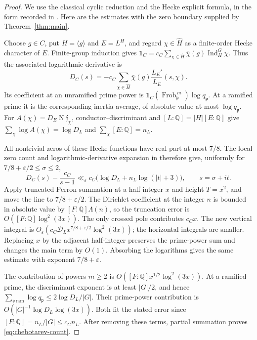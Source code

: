 \documentclass[11pt,a4paper]{article}
\numberwithin{equation}{section}
\theoremstyle{definition}
\theoremstyle{remark}
\newcommand{\eps}{\varepsilon}
\newcommand{\QQ}{\mathbb Q}
\newcommand{\Norm}{\operatorname{N}}
\newcommand{\ind}{\mathbf 1}
\begin{document}
\begin{proof}
We use the classical cyclic reduction and the Hecke explicit formula,
in the form recorded in \cite[Section~3, Lemmas~4--5 and Proposition~6]{DKN}.
Here are the estimates with the zero boundary supplied by
Theorem~\ref{thm:main}.

Choose $g\in C$, put $H=\langle g\rangle$ and $E=L^H$, and regard
$\chi\in\widehat H$ as a finite-order Hecke character of $E$.
Finite-group induction gives
$\ind_C=c_C\sum_{\chi\in\widehat H}\bar\chi(g)
\operatorname{Ind}_H^G\chi$. Thus the associated logarithmic derivative is
\begin{equation}\label{eq:chebotarev-logder}
 D_C(s)=-c_C\sum_{\chi\in\widehat H}
          \bar\chi(g)\frac{L_E'}{L_E}(s,\chi).
\end{equation}
Its coefficient at an unramified prime power is
$\ind_C(\operatorname{Frob}_{\mathfrak p}^{\,m})\log q_{\mathfrak p}$.
At a ramified prime it is the corresponding inertia average, of
absolute value at most $\log q_{\mathfrak p}$.
For $A(\chi)=D_E\Norm\mathfrak f_\chi$, conductor--discriminant and
$[L:\QQ]=|H|[E:\QQ]$ give
$\sum_\chi\log A(\chi)=\log D_L$ and
$\sum_\chi[E:\QQ]=n_L$.

All nontrivial zeros of these Hecke functions have real part at most
$7/8$. The local zero count and logarithmic-derivative expansion in
\cite[Lemma~5, equations~(3.18) and~(3.21)]{DKN} therefore give,
uniformly for $7/8+\eps/2\le\sigma\le2$,
\begin{equation}\label{eq:chebotarev-line}
 D_C(s)-\frac{c_C}{s-1}
 \ll_\eps c_C\bigl(\log D_L+n_L\log(|t|+3)\bigr),
 \qquad s=\sigma+it.
\end{equation}
Apply truncated Perron summation at a half-integer $x$ and height
$T=x^2$, and move the line to $7/8+\eps/2$.
The Dirichlet coefficient at the integer $n$ is bounded in absolute
value by $[F:\QQ]\Lambda(n)$, so the truncation error is
$O([F:\QQ]\log^2(3x))$. The only crossed pole contributes $c_Cx$.
The new vertical integral is
$O_\eps(c_C\mathcal D_Lx^{7/8+\eps/2}\log^2(3x))$;
the horizontal integrals are smaller. Replacing $x$ by the adjacent
half-integer preserves the prime-power sum and changes the main term
by $O(1)$. Absorbing the logarithms gives the same estimate with
exponent $7/8+\eps$.

The contribution of powers $m\ge2$ is
$O([F:\QQ]x^{1/2}\log^2(3x))$.
At a ramified prime, the discriminant exponent is at least
$|G|/2$, and hence
$\sum_{\mathfrak p\,\mathrm{ram}}\log q_{\mathfrak p}
\le2\log D_L/|G|$.
Their prime-power contribution is
$O(|G|^{-1}\log D_L\log(3x))$.
Both fit the stated error since
$[F:\QQ]=n_L/|G|\le c_Cn_L$.
After removing these terms, partial summation proves
\eqref{eq:chebotarev-count}.


\end{proof}
\end{document}
